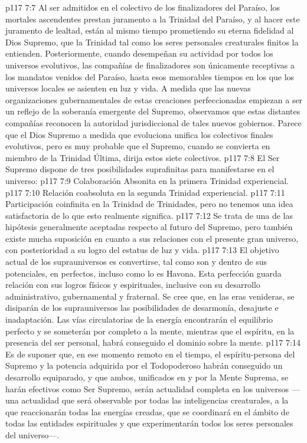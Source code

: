 \vs p117 7:7 \pc Al ser admitidos en el colectivo de los finalizadores del Paraíso, los mortales ascendentes prestan juramento a la Trinidad del Paraíso, y al hacer este juramento de lealtad, están al mismo tiempo prometiendo su eterna fidelidad al Dios Supremo, que  la Trinidad tal como los seres personales creaturales finitos la entienden. Posteriormente, cuando desempeñan su actividad por todos los universos evolutivos, las compañías de finalizadores son únicamente receptivas a los mandatos venidos del Paraíso, hasta esos memorables tiempos en los que los universos locales se asienten en luz y vida. A medida que las nuevas organizaciones gubernamentales de estas creaciones perfeccionadas empiezan a ser un reflejo de la soberanía emergente del Supremo, observamos que estas distantes compañías reconocen la autoridad jurisdiccional de tales nuevos gobiernos. Parece que el Dios Supremo a medida que evoluciona unifica los colectivos finales evolutivos, pero es muy probable que el Supremo, cuando se convierta en miembro de la Trinidad Última, dirija estos siete colectivos.
\vs p117 7:8 \pc El Ser Supremo dispone de tres posibilidades suprafinitas para manifestarse en el universo:
\vs p117 7:9 Colaboración Absonita en la primera Trinidad experiencial.
\vs p117 7:10 Relación coabsoluta en la segunda Trinidad experiencial.
\vs p117 7:11 Participación coinfinita en la Trinidad de Trinidades, pero no tenemos una idea satisfactoria de lo que esto realmente significa.
\vs p117 7:12 \pc Se trata de una de las hipótesis generalmente aceptadas respecto al futuro del Supremo, pero también existe mucha suposición en cuanto a sus relaciones con el presente gran universo, con posterioridad a su logro del estatus de luz y vida.
\vs p117 7:13 El objetivo actual de los suprauniversos es convertirse, tal como son y dentro de sus potenciales, en perfectos, incluso como lo es Havona. Esta perfección guarda relación con sus logros físicos y espirituales, inclusive con su desarrollo administrativo, gubernamental y fraternal. Se cree que, en las eras venideras, se disiparán de los suprauniversos las posibilidades de desarmonía, desajuste e inadaptación. Las vías circulatorias de la energía encontrarán el equilibrio perfecto y se someterán por completo a la mente, mientras que el espíritu, en la presencia del ser personal, habrá conseguido el dominio sobre la mente.
\vs p117 7:14 Es de suponer que, en ese momento remoto en el tiempo, el espíritu\hyp{}persona del Supremo y la potencia adquirida por el Todopoderoso habrán conseguido un desarrollo equiparado, y que ambos, unificados en y por la Mente Suprema, se harán efectivos como Ser Supremo, serán actualidad completa en los universos ---una actualidad que será observable por todas las inteligencias creaturales, a la que reaccionarán todas las energías creadas, que se coordinará en el ámbito de todas las entidades espirituales y que experimentarán todos los seres personales del universo---.
